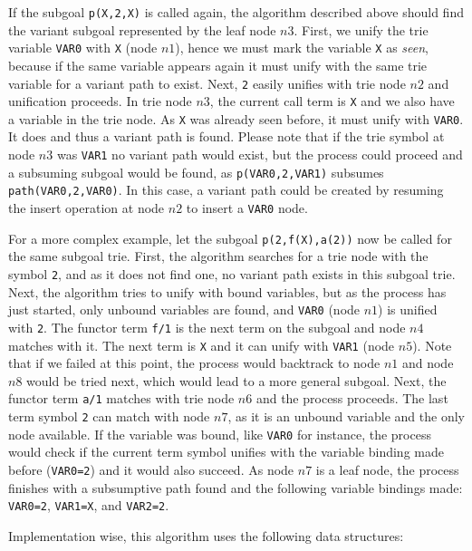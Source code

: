 If the subgoal \texttt{p(X,2,X)} is called again, the algorithm described above
should find the variant subgoal represented by the leaf node $n3$. First, we unify the trie variable
\texttt{VAR0} with \texttt{X} (node $n1$), hence we must mark the variable \texttt{X} as \textit{seen},
because if the same variable appears again it must unify with the same trie variable for a variant path
to exist. Next, \texttt{2} easily unifies with trie node $n2$ and unification proceeds. In trie node $n3$,
the current call term is \texttt{X} and we also have a variable in the trie node. As \texttt{X} was already seen before,
it must unify with \texttt{VAR0}. It does and thus a variant path is found. Please note that if
the trie symbol at node $n3$ was \texttt{VAR1} no variant path would exist, but the process could proceed
and a subsuming subgoal would be found, as \texttt{p(VAR0,2,VAR1)} subsumes \texttt{path(VAR0,2,VAR0)}.
In this case, a variant path could be created by resuming the insert operation at node $n2$ to insert
a \texttt{VAR0} node.

For a more complex example, let the subgoal \texttt{p(2,f(X),a(2))} now be called for the same subgoal trie. First,
the algorithm searches for a trie node with the symbol \texttt{2}, and as it does not find one, no variant path
exists in this subgoal trie. Next, the algorithm tries to unify with bound variables, but as the process
has just started, only unbound variables are found, and \texttt{VAR0} (node $n1$) is unified with \texttt{2}.
The functor term \texttt{f/1} is the next term on the subgoal and node $n4$ matches with it.
The next term is \texttt{X} and it can unify with \texttt{VAR1} (node $n5$).
Note that if we failed at this point, the process would backtrack to node $n1$ and node $n8$
would be tried next, which would lead to a more general subgoal.
Next, the functor term \texttt{a/1} matches with trie node $n6$ and the process proceeds.
The last term symbol \texttt{2} can match with node $n7$, as it is an unbound variable
and the only node available.
If the variable was bound, like \texttt{VAR0} for instance,
the process would check if the current term symbol unifies with the variable binding made before (\texttt{VAR0=2}) and
it would also succeed. As node $n7$ is a leaf node, the process finishes with a subsumptive path found and
the following variable bindings made: \texttt{VAR0=2}, \texttt{VAR1=X}, and \texttt{VAR2=2}.

Implementation wise, this algorithm uses the following data structures:

